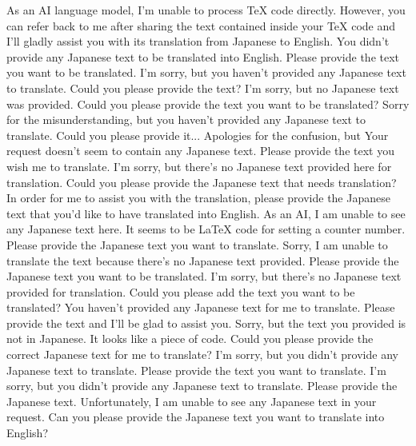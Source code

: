 {%
As an AI language model, I'm unable to process TeX code directly. However, you can refer back to me after sharing the text contained inside your TeX code and I'll gladly assist you with its translation from Japanese to English.
You didn't provide any Japanese text to be translated into English. Please provide the text you want to be translated.
I'm sorry, but you haven't provided any Japanese text to translate. Could you please provide the text?
I'm sorry, but no Japanese text was provided. Could you please provide the text you want to be translated?
Sorry for the misunderstanding, but you haven't provided any Japanese text to translate. Could you please provide it...
Apologies for the confusion, but Your request doesn't seem to contain any Japanese text. Please provide the text you wish me to translate.
I'm sorry, but there's no Japanese text provided here for translation. Could you please provide the Japanese text that needs translation?
In order for me to assist you with the translation, please provide the Japanese text that you'd like to have translated into English.
As an AI, I am unable to see any Japanese text here. It seems to be LaTeX code for setting a counter number. Please provide the Japanese text you want to translate.
Sorry, I am unable to translate the text because there's no Japanese text provided. Please provide the Japanese text you want to be translated.
I'm sorry, but there's no Japanese text provided for translation. Could you please add the text you want to be translated?
You haven't provided any Japanese text for me to translate. Please provide the text and I'll be glad to assist you.
Sorry, but the text you provided is not in Japanese. It looks like a piece of code. Could you please provide the correct Japanese text for me to translate?
I'm sorry, but you didn't provide any Japanese text to translate. Please provide the text you want to translate.
I'm sorry, but you didn't provide any Japanese text to translate. Please provide the Japanese text.
Unfortunately, I am unable to see any Japanese text in your request. Can you please provide the Japanese text you want to translate into English?
}
